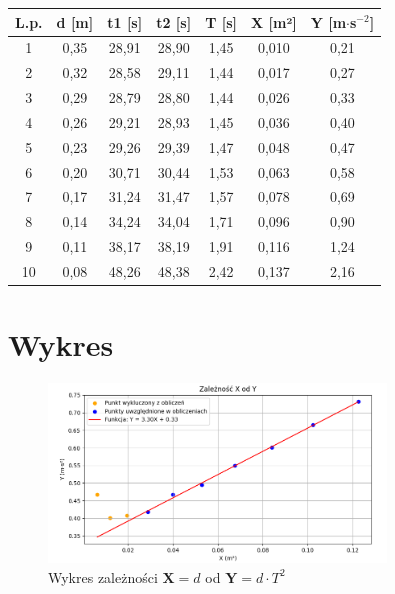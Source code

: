 \documentclass[12pt]{article}
\begin{document}
\begin{center}
    \begin{tabular}{|c|c|c|c|c|c|c|}
    \hline
    L.p. & d [m] & t1 [s] & t2 [s] & T [s] & X [m²] & Y [m$\cdot$s$^{-2}$] \\
    \hline
    1 & 0{,}35 & 28{,}91 & 28{,}90 & 1{,}45 & 0{,}010 & 0{,}21 \\
    2 & 0{,}32 & 28{,}58 & 29{,}11 & 1{,}44 & 0{,}017 & 0{,}27 \\
    3 & 0{,}29 & 28{,}79 & 28{,}80 & 1{,}44 & 0{,}026 & 0{,}33 \\
    4 & 0{,}26 & 29{,}21 & 28{,}93 & 1{,}45 & 0{,}036 & 0{,}40 \\
    5 & 0{,}23 & 29{,}26 & 29{,}39 & 1{,}47 & 0{,}048 & 0{,}47 \\
    6 & 0{,}20 & 30{,}71 & 30{,}44 & 1{,}53 & 0{,}063 & 0{,}58 \\
    7 & 0{,}17 & 31{,}24 & 31{,}47 & 1{,}57 & 0{,}078 & 0{,}69 \\
    8 & 0{,}14 & 34{,}24 & 34{,}04 & 1{,}71 & 0{,}096 & 0{,}90 \\
    9 & 0{,}11 & 38{,}17 & 38{,}19 & 1{,}91 & 0{,}116 & 1{,}24 \\
    10 & 0{,}08 & 48{,}26 & 48{,}38 & 2{,}42 & 0{,}137 & 2{,}16 \\
    \hline
    \end{tabular}
    \end{center}
    


\section*{Wykres}

\begin{figure}[H]
    \centering
    \includegraphics[width=0.8\textwidth]{pendulum.png}
    \caption{Wykres zależności \( \textbf{X} = d \) od \( \textbf{Y} = d \cdot T^2 \)}
    \label{fig:pendulum}
\end{figure}
\end{document}
